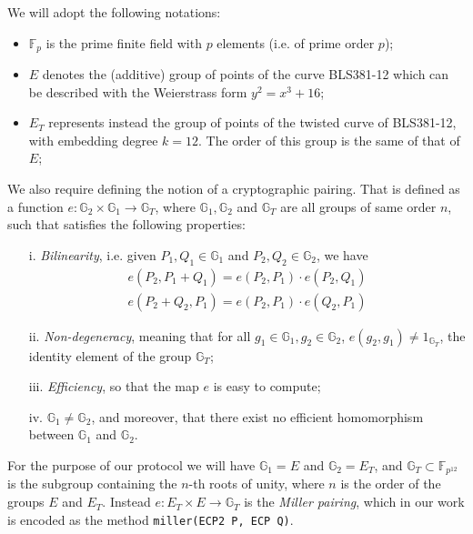 We will adopt the following notations:
\begin{itemize}

\item $\mathbb{F}_p$ is the prime finite field with $p$ elements
  (i.e. of prime order $p$);

\item $E$ denotes the (additive) group of points of the curve
  BLS381-12 \cite{bls381-12} which can be described with the
  Weierstrass form $y^2=x^3 + 16$;

\item $E_T$ represents instead the group of points of the twisted
  curve of BLS381-12, with embedding degree $k=12$. The order of
  this group is the same of that of $E$;

\end{itemize}

We also require defining the notion of a cryptographic
pairing. That is defined as a function $e:
\mathbb{G}_2\times\mathbb{G}_1\to \mathbb{G}_T$, where
$\mathbb{G}_1,\mathbb{G}_2$ and $\mathbb{G}_T$ are all groups of same
order $n$, such that satisfies the following properties:

\begin{itemize}

\item [i.] \emph{Bilinearity}, i.e. given $P_1,Q_1\in\mathbb{G}_1$
  and $P_2,Q_2\in\mathbb{G}_2$, we have
  \begin{align*}
    e(P_2,P_1+Q_1) = e(P_2,P_1)\cdot e(P_2,Q_1)   \\
    e(P_2+Q_2,P_1) = e(P_2,P_1)\cdot e(Q_2,P_1)
  \end{align*}

\item[ii.] \emph{Non-degeneracy}, meaning that for all
  $g_1\in\mathbb{G}_1, g_2\in\mathbb{G}_2$, $e(g_2,g_1)\ne
  1_{\mathbb{G}_T}$, the identity element of the group
  $\mathbb{G}_T$;

\item[iii.] \emph{ Efficiency}, so that the map $e$ is easy to
  compute;

\item[iv. ] $\mathbb{G}_1\ne \mathbb{G}_2$, and moreover, that
  there exist no efficient homomorphism between $\mathbb{G}_1$ and
  $\mathbb{G}_2$.

\end{itemize}

For the purpose of our protocol we will have $\mathbb{G}_1 = E$ and
$\mathbb{G}_2 = E_T$, and $\mathbb{G}_T\subset \mathbb{F}_{p^{12}}$ is
the subgroup containing the $n$-th roots of unity, where $n$ is the
order of the groups $E$ and $E_T$. Instead $e: E_T \times E\to
\mathbb{G}_T$ is the \emph{Miller pairing}, which in our work is
encoded as the method \verb!miller(ECP2 P, ECP Q)!. \\


